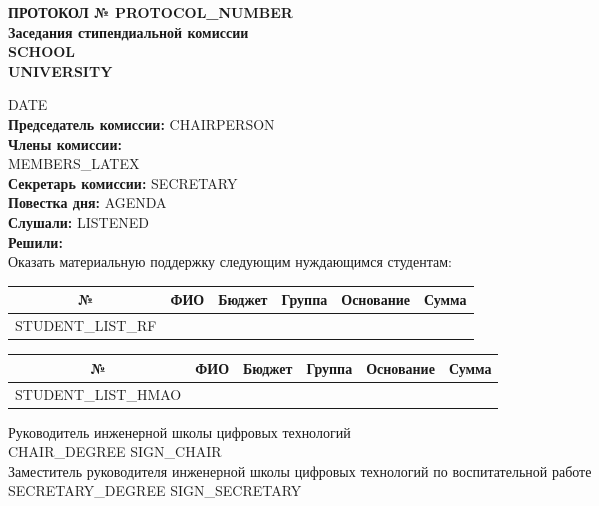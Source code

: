 \documentclass[a4paper,12pt]{article}
\begin{document}
\begin{center}
\textbf{ПРОТОКОЛ № {PROTOCOL_NUMBER}} \\
\textbf{Заседания стипендиальной комиссии} \\
\textbf{{SCHOOL}} \\
\textbf{{UNIVERSITY}} \\
\end{center}
\vspace{0.5cm}
{DATE} \hfill \\
\vspace{1cm}
\textbf{Председатель комиссии:} {CHAIRPERSON} \\
\textbf{Члены комиссии:} \\
{MEMBERS_LATEX} \\
\textbf{Секретарь комиссии:} {SECRETARY} \\
\textbf{Повестка дня:} {AGENDA} \\
\textbf{Слушали:} {LISTENED} \\
\vspace{0.5cm}
\textbf{Решили:} \\
Оказать материальную поддержку следующим нуждающимся студентам: \\
\vspace{0.5cm}
\begin{longtable}{|c|p{5cm}|c|c|p{5cm}|c|}
\hline
№ & ФИО & Бюджет & Группа & Основание & Сумма \\
\hline
{STUDENT_LIST_RF}
\hline
\end{longtable}
\vspace{0.5cm}
\begin{longtable}{|c|p{5cm}|c|c|p{5cm}|c|}
\hline
№ & ФИО & Бюджет & Группа & Основание & Сумма \\
\hline
{STUDENT_LIST_HMAO}
\hline
\end{longtable}
\vspace{1cm}
Руководитель инженерной школы цифровых технологий \\
{CHAIR_DEGREE} \hfill \underline{\hspace{4cm}} \hfill {SIGN_CHAIR} \\
\vspace{0.5cm}
Заместитель руководителя инженерной школы цифровых технологий по воспитательной работе \\
{SECRETARY_DEGREE} \hfill \underline{\hspace{4cm}} \hfill {SIGN_SECRETARY} \\
\end{document}
